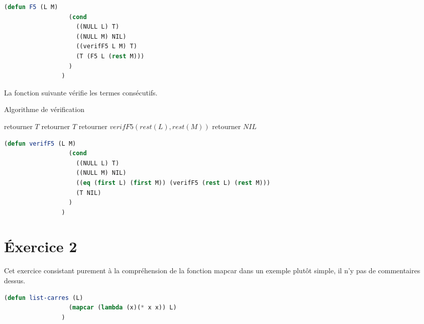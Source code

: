 \documentclass[a4paper, 12pt, leqno]{report}
\theoremstyle{plain}
\begin{document}
            \begin{lstlisting}[label=some-code,caption=F5 (L M) version récusive 2,language=lisp]
                (defun F5 (L M) 
	              (cond
		            ((NULL L) T)
		            ((NULL M) NIL)
		            ((verifF5 L M) T)
		            (T (F5 L (rest M)))
	              )
                )
            \end{lstlisting} 
            \newpage      
            La fonction suivante vérifie les termes consécutifs.
            
                      \begin{algorithm}
            \caption{Algorithme de vérification}
            \begin{algorithmic}
                \State retourner $T$
                     \State retourner $T$
                    \State retourner $verifF5(rest(L),rest(M))$
            \Else 
                    \State retourner $NIL$        
            \EndIf        
            \end{algorithmic}
            \end{algorithm}
            
            \begin{lstlisting}[label=some-code,caption=verifF5 (L M) version récusive 2,language=lisp]
                (defun verifF5 (L M)
	              (cond
		            ((NULL L) T)
		            ((NULL M) NIL)
		            ((eq (first L) (first M)) (verifF5 (rest L) (rest M)))
		            (T NIL)
	              )
                )
            \end{lstlisting} 
        
        \chapter{\'Exercice 2}   
            
        Cet exercice consistant purement à la compréhension de la fonction mapcar dans un exemple plutôt simple, il n’y pas de commentaires dessus.
        
        \begin{lstlisting}[label=some-code,caption=list-carres (L) avec fonction lambda,language=lisp]
                (defun list-carres (L)
                  (mapcar (lambda (x)(* x x)) L)
                ) 
            \end{lstlisting}
        
\end{document}
